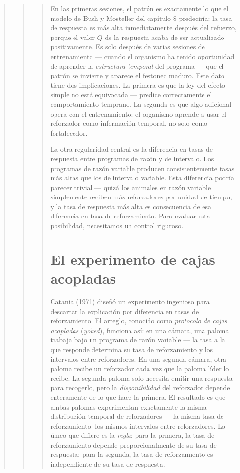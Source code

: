\documentclass[
  letterpaper,
  DIV=11,
  numbers=noendperiod]{scrreprt}
\begin{document}
\begin{tcolorbox}[enhanced jigsaw, toprule=.15mm, arc=.35mm, colback=white, opacityback=0, colframe=quarto-callout-note-color-frame, breakable, rightrule=.15mm, left=2mm, leftrule=.75mm, bottomrule=.15mm]
\begin{quote}
\begin{quote}
\begin{quote}
En las primeras sesiones, el patrón es exactamente lo que el modelo de
Bush y Mosteller del capítulo 8 predeciría: la tasa de respuesta es más
alta inmediatamente después del refuerzo, porque el valor \(Q\) de la
respuesta acaba de ser actualizado positivamente. Es solo después de
varias sesiones de entrenamiento --- cuando el organismo ha tenido
oportunidad de aprender la \emph{estructura temporal} del programa ---
que el patrón se invierte y aparece el festoneo maduro. Este dato tiene
dos implicaciones. La primera es que la ley del efecto simple no está
equivocada --- predice correctamente el comportamiento temprano. La
segunda es que algo adicional opera con el entrenamiento: el organismo
aprende a usar el reforzador como información temporal, no solo como
fortalecedor.

La otra regularidad central es la diferencia en tasas de respuesta entre
programas de razón y de intervalo. Los programas de razón variable
producen consistentemente tasas más altas que los de intervalo variable.
Esta diferencia podría parecer trivial --- quizá los animales en razón
variable simplemente reciben más reforzadores por unidad de tiempo, y la
tasa de respuesta más alta es consecuencia de esa diferencia en tasa de
reforzamiento. Para evaluar esta posibilidad, necesitamos un control
riguroso.

\section{El experimento de cajas
acopladas}\label{el-experimento-de-cajas-acopladas}

Catania (1971) diseñó un experimento ingenioso para descartar la
explicación por diferencia en tasas de reforzamiento. El arreglo,
conocido como \emph{protocolo de cajas acopladas} (\emph{yoked}),
funciona así: en una cámara, una paloma trabaja bajo un programa de
razón variable --- la tasa a la que responde determina su tasa de
reforzamiento y los intervalos entre reforzadores. En una segunda
cámara, otra paloma recibe un reforzador cada vez que la paloma líder lo
recibe. La segunda paloma solo necesita emitir una respuesta para
recogerlo, pero la \emph{disponibilidad} del reforzador depende
enteramente de lo que hace la primera. El resultado es que ambas palomas
experimentan exactamente la misma distribución temporal de reforzadores
--- la misma tasa de reforzamiento, los mismos intervalos entre
reforzadores. Lo único que difiere es la \emph{regla}: para la primera,
la tasa de reforzamiento depende proporcionalmente de su tasa de
respuesta; para la segunda, la tasa de reforzamiento es independiente de
su tasa de respuesta.


\end{quote}
\end{quote}
\end{quote}
\end{tcolorbox}
\end{document}
